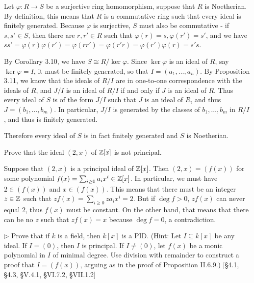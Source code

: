 \begin{solution}
	Let $\varphi: R \to S$ be a surjective ring homomorphism, suppose that $R$ is Noetherian. By definition, this means that $R$ is a commutative ring such that every ideal is finitely generated. Because $\varphi$ is surjective, $S$ must also be commutative - if $s, s' \in S$, then there are $r, r' \in R$ such that $\varphi(r) = s, \varphi(r') = s'$, and we have $ss' = \varphi(r)\varphi(r') = \varphi(rr') = \varphi(r'r) = \varphi(r')\varphi(r) = s's$.
	
	By Corollary 3.10, we have $S \cong R/\ker \varphi$. Since $\ker \varphi$ is an ideal of $R$, say $\ker \varphi = I$, it must be finitely generated, so that $I = (a_1, \dots, a_n)$. By Proposition 3.11, we know that the ideals of $R/I$ are in one-to-one correspondence with the ideals of $R$, and $J/I$ is an ideal of $R/I$ if and only if $J$ is an ideal of $R$. Thus every ideal of $S$ is of the form $J/I$ such that $J$ is an ideal of $R$, and thus $J = (b_1, \dots, b_m)$. In particular, $J/I$ is generated by the classes of $b_1, \dots, b_m$ in $R/I$, and thus is finitely generated.
	
	Therefore every ideal of $S$ is in fact finitely generated and $S$ is Noetherian.
\end{solution}

\begin{problem}
	Prove that the ideal $(2, x)$ of $\mathbb{Z}[x]$ is not principal.
\end{problem}

\begin{solution}
	Suppose that $(2, x)$ is a principal ideal of $\mathbb{Z}[x]$. Then $(2, x) = (f(x))$ for some polynomial $f(x) = \sum_{i \geq 0} a_i x^i \in \mathbb{Z}[x]$. In particular, we must have $2 \in (f(x))$ and $x \in (f(x))$. This means that there must be an integer $z \in \mathbb{Z}$ such that $z f(x) = \sum_{i \geq 0} z a_i x^i = 2$. But if $\deg f > 0$, $z f(x)$ can never equal $2$, thus $f(x)$ must be constant. On the other hand, that means that there can be no $z$ such that $z f(x) = x$ because $\deg f = 0$, a contradiction.
\end{solution}

\begin{problem}
	$\triangleright$ Prove that if $k$ is a field, then $k[x]$ is a PID. (Hint: Let $I \subseteq k[x]$ be any ideal. If $I = (0)$, then $I$ is principal. If $I \neq (0)$, let $f(x)$ be a monic polynomial in $I$ of minimal degree. Use division with remainder to construct a proof that $I = (f(x))$, arguing as in the proof of Proposition II.6.9.) [\S 4.1, \S 4.3, \S V.4.1, \S VI.7.2, \S VII.1.2]
\end{problem}

